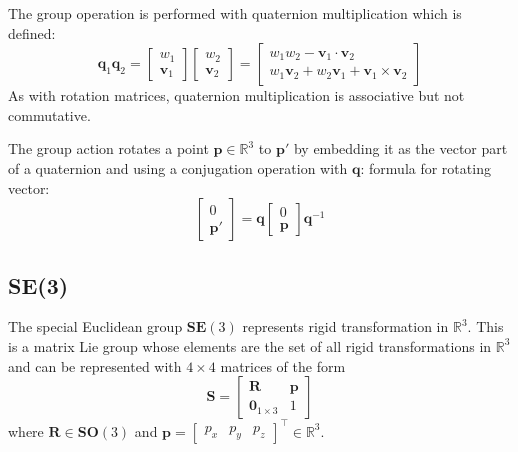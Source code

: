 		The group operation is performed with quaternion multiplication which is defined:
		\begin{equation}
			\mathbf{q}_1\mathbf{q}_2 =
			\begin{bmatrix}
			 	w_1 \\
			 	\mathbf{v}_1
			\end{bmatrix} 
			\begin{bmatrix}
			 	w_2 \\
			 	\mathbf{v}_2
			\end{bmatrix} 
			=
			\begin{bmatrix}
			 	w_1w_2 - \mathbf{v}_1 \cdot \mathbf{v}_2 \\
			 	w_1\mathbf{v}_2 + w_2\mathbf{v}_1 + \mathbf{v}_1 \times \mathbf{v}_2
			\end{bmatrix} 
		\end{equation} 
		As with rotation matrices, quaternion multiplication is associative but not commutative.
		
		The group action rotates a point $\mathbf{p} \in \mathbb{R}^3$  to $\mathbf{p}'$ by embedding it as the vector part of a quaternion and using a conjugation operation with $\mathbf{q}$:
		formula for rotating vector:
		\begin{equation} \label{quatrot}
			\begin{bmatrix}
			 	0\\
			 	\mathbf{p'}
			\end{bmatrix}
			= \mathbf{q}
			\begin{bmatrix}
			 	0\\
			 	\mathbf{p}
			\end{bmatrix}
			\mathbf{q}^{-1}
		\end{equation}
		
	\subsection{\textbf{SE}(3)}	
		The special Euclidean group $\textbf{SE}(3)$ represents rigid transformation in $\mathbb{R}^3$. This is a matrix Lie group whose elements are the set of all rigid transformations in $\mathbb{R}^3$ and can be represented with $4 \times 4$ matrices of the form
		\begin{equation}
			\textbf{S} = 
			\begin{bmatrix}
				  \mathbf{R}	&	\mathbf{p} \\
				  \textbf{0}_{1 \times 3}		& 	1 
			\end{bmatrix}
		\end{equation}
		where $\mathbf{R} \in \mathbf{SO}(3)$ and 
		$\mathbf{p} = 
		\begin{bmatrix}
			p_x	& p_y & p_z				
		\end{bmatrix}
		^\top \in \mathbb{R}^3$.
		
